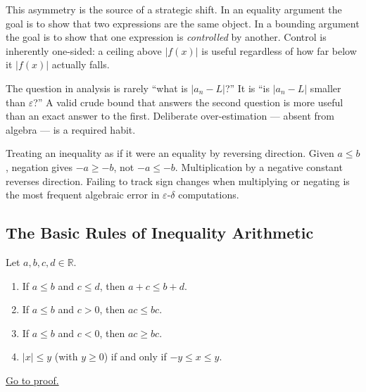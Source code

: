 This asymmetry is the source of a strategic shift. In an equality argument
the goal is to show that two expressions are the same object. In a bounding
argument the goal is to show that one expression is \emph{controlled} by
another. Control is inherently one-sided: a ceiling above $|f(x)|$ is useful
regardless of how far below it $|f(x)|$ actually falls.

\begin{remark}
The question in analysis is rarely ``what is $|a_n-L|$?'' It is ``is
$|a_n-L|$ smaller than $\varepsilon$?'' A valid crude bound that answers the
second question is more useful than an exact answer to the first. Deliberate
over-estimation --- absent from algebra --- is a required habit.
\end{remark}

\begin{remark}
Treating an inequality as if it were an equality by reversing direction.
Given $a\leq b$, negation gives $-a\geq -b$, not $-a\leq -b$. Multiplication
by a negative constant reverses direction. Failing to track sign changes
when multiplying or negating is the most frequent algebraic error in
$\varepsilon$-$\delta$ computations.
\end{remark}

\subsection*{The Basic Rules of Inequality Arithmetic}
\label{subsec:ineq-rules}

\begin{proposition}
\label{prop:order-arithmetic}
Let $a,b,c,d\in\mathbb{R}$.
\begin{enumerate}[label=(\roman*)]
  \item If $a\leq b$ and $c\leq d$, then $a+c\leq b+d$.
  \item If $a\leq b$ and $c>0$, then $ac\leq bc$.
  \item If $a\leq b$ and $c<0$, then $ac\geq bc$.
  \item $|x|\leq y$ (with $y\geq 0$) if and only if $-y\leq x\leq y$.
\end{enumerate}
\hyperref[prf:order-arithmetic]{Go to proof.}
\end{proposition}

\begin{remark*}
\end{remark*}


